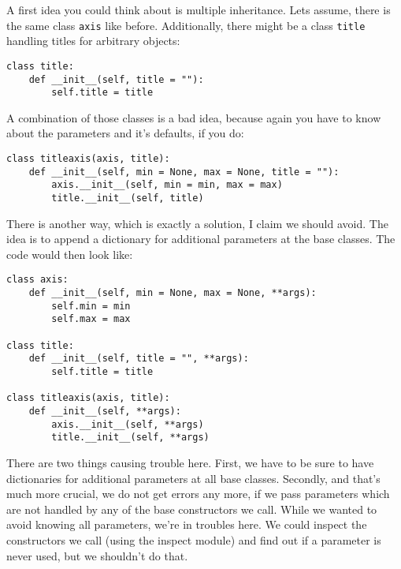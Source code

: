 \documentclass{article}
\begin{document}
A first idea you could think about is multiple inheritance. Lets
assume, there is the same class \verb|axis| like before. Additionally,
there might be a class \verb|title| handling titles for arbitrary
objects:

\begin{verbatim}
class title:
    def __init__(self, title = ""):
        self.title = title
\end{verbatim}

A combination of those classes is a bad idea, because again you have
to know about the parameters and it's defaults, if you do:
\begin{verbatim}
class titleaxis(axis, title):
    def __init__(self, min = None, max = None, title = ""):
        axis.__init__(self, min = min, max = max)
        title.__init__(self, title)
\end{verbatim}

There is another way, which is exactly a solution, I claim we should
avoid. The idea is to append a dictionary for additional parameters at
the base classes. The code would then look like:

\begin{verbatim}
class axis:
    def __init__(self, min = None, max = None, **args):
        self.min = min
        self.max = max

class title:
    def __init__(self, title = "", **args):
        self.title = title

class titleaxis(axis, title):
    def __init__(self, **args):
        axis.__init__(self, **args)
        title.__init__(self, **args)
\end{verbatim}

There are two things causing trouble here. First, we have to be sure
to have dictionaries for additional parameters at all base classes.
Secondly, and that's much more crucial, we do not get errors any more,
if we pass parameters which are not handled by any of the base
constructors we call. While we wanted to avoid knowing all parameters,
we're in troubles here. We could inspect the constructors we call
(using the inspect module) and find out if a parameter is never used,
but we shouldn't do that.
\end{document}
